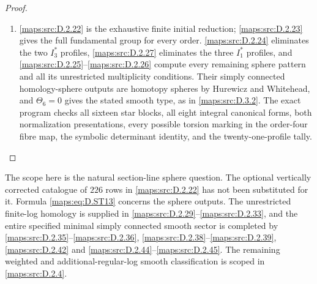 \begin{proof}
\begin{enumerate}[label=\arabic*.,leftmargin=*]
\item \ref{maps:src:D.2.22} is the exhaustive finite initial reduction; \ref{maps:src:D.2.23} gives
the full fundamental group for every order. \ref{maps:src:D.2.24} eliminates
the two $I_3^*$ profiles, \ref{maps:src:D.2.27} eliminates the three $I_1^*$
profiles, and \ref{maps:src:D.2.25}--\ref{maps:src:D.2.26} compute every remaining sphere pattern
and all its unrestricted multiplicity conditions. Their
simply connected homology-sphere outputs are homotopy spheres
by Hurewicz and Whitehead, and $\Theta_6=0$ gives the stated
smooth type, as in \ref{maps:src:D.3.2}. The exact program
 checks all sixteen
star blocks, all eight integral canonical forms, both
normalization presentations, every possible torsion marking
in the order-four fibre map, the symbolic determinant identity,
and the twenty-one-profile tally.
\end{enumerate}
\end{proof}

The scope here is the natural section-line sphere question.
The optional vertically corrected catalogue of $226$ rows in
\ref{maps:src:D.2.22} has not been substituted for it. Formula \eqref{maps:eq:D.ST13} concerns the sphere outputs. The unrestricted
finite-log homology is supplied in \ref{maps:src:D.2.29}--\ref{maps:src:D.2.33}, and the entire specified
minimal simply connected smooth sector is completed by \ref{maps:src:D.2.35}--\ref{maps:src:D.2.36},
\ref{maps:src:D.2.38}--\ref{maps:src:D.2.39}, \ref{maps:src:D.2.42} and \ref{maps:src:D.2.44}--\ref{maps:src:D.2.45}. The remaining weighted and
additional-regular-log smooth classification is scoped in \ref{maps:src:D.2.4}.


